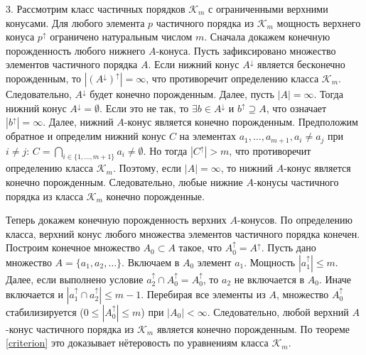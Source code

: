 \documentclass[12pt]{article}
\theoremstyle{break}
\def\K{\mathcal{K}_m}
\begin{document}
		3. Рассмотрим класс частичных порядков $\K$ с ограниченными верхними конусами. Для любого элемента $p$ частичного порядка из $\K$ мощность верхнего конуса $p^{\uparrow}$ ограничено натуральным числом $m$. Сначала докажем конечную порожденность любого нижнего $A$-конуса. Пусть зафиксировано множество элементов частичного порядка $A$. Если нижний конус $A^{\downarrow}$ является бесконечно порожденным, то $|(A^{\downarrow})^{\uparrow}| = \infty$, что противоречит определению класса $\K$. Следовательно, $A^{\downarrow}$ будет конечно порожденным. Далее, пусть $|A| = \infty$. Тогда нижний конус $A^{\downarrow} = \emptyset$. Если это не так, то $\exists b\in A^{\downarrow}$ и $b^{\uparrow} \supseteq A$, что означает $|b^{\uparrow}| = \infty$. Далее, нижний $A$-конус является конечно порожденным. Предположим обратное и определим нижний конус $C$ на элементах $a_1,\dots,a_{m+1}, a_i\neq a_j$ при $i\neq j$: $C = \bigcap_{i\in\{1,\dots, m+1\}}a_{i} \neq \emptyset$. Но тогда $|C^{\uparrow}| > m$, что противоречит определению класса $\K$. Поэтому, если $|A|=\infty$, то нижний $A$-конус является конечно порожденным. Следовательно, любые нижние $A$-конусы частичного порядка из класса $\K$ конечно порожденные.

		Теперь докажем конечную порожденность верхних $A$-конусов. По определению класса, верхний конус любого множества элементов частичного порядка конечен. Построим конечное множество $A_0\subset A$ такое, что $A_0^{\uparrow} = A^{\uparrow}$. Пусть дано множество $A = \{a_1, a_2,\dots\}.$ Включаем в $A_0$ элемент $a_1$. Мощность $|a_1^{\uparrow}| \leqslant m.$ Далее, если выполнено условие $a_2^{\uparrow} \cap A_0^{\uparrow} = A_0^{\uparrow}$, то $a_2$ не включается в $A_0$. Иначе включается и $|a_1^{\uparrow} \cap a_2^{\uparrow}| \leqslant m-1$. Перебирая все элементы из $A$, множество $A_0^{\uparrow}$ стабилизируется ($0 \leqslant |A_0^{\uparrow}| \leqslant m$) при $|A_0|<\infty$. Следовательно, любой верхний $A$-конус частичного порядка из $\K$ является конечно порожденным. По теореме \ref{criterion} это доказывает нётеровость по уравнениям класса $\K$.

		
	
\end{document}
